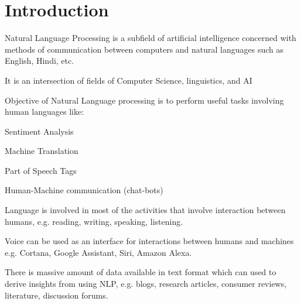 	\section{Introduction}
	\begin{bulletedlist}
		\item Natural Language Processing is a subfield of artificial intelligence concerned with methods of communication between computers and natural languages such as English, Hindi, etc.
		\item It is an intersection of fields of Computer Science, linguistics, and AI
		\item Objective of Natural Language processing is to perform useful tasks involving human languages like:
		\begin{bulletedlist}
			\item Sentiment Analysis
			\item Machine Translation
			\item Part of Speech Tags
			\item Human-Machine communication (chat-bots)
		\end{bulletedlist}
		\item Language is involved in most of the activities that involve interaction between humans, e.g. reading, writing, speaking, listening.
		\item Voice can be used as an interface for interactions between humans and machines e.g. Cortana, Google Assistant, Siri, Amazon Alexa.
		\item There is massive amount of data available in text format which can used to derive insights from using NLP, e.g. blogs, research articles, consumer reviews, literature, discussion forums.
	\end{bulletedlist}

